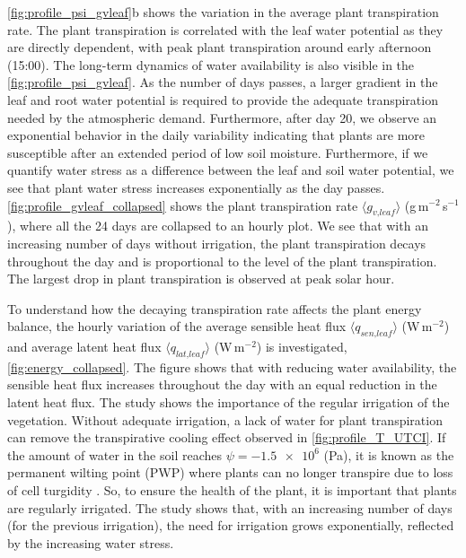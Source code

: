 \cref{fig:profile_psi_gvleaf}b shows the variation in the average plant transpiration rate. The plant transpiration is correlated with the leaf water potential as they are directly dependent, with peak plant transpiration around early afternoon (15:00).  The long-term dynamics of water availability is also visible in the \cref{fig:profile_psi_gvleaf}. As the number of days passes, a larger gradient in the leaf and root water potential is required to provide the adequate transpiration needed by the atmospheric demand. Furthermore, after day 20, we observe an exponential behavior in the daily variability indicating that plants are more susceptible after an extended period of low soil moisture. Furthermore, if we quantify water stress as a difference between the leaf and soil water potential, we see that plant water stress increases exponentially as the day passes. \cref{fig:profile_gvleaf_collapsed} shows the plant transpiration rate $\langle g_{\textit{v,leaf}} \rangle$ (g\,m$^{-2}$\,s$^{-1}$), where all the 24 days are collapsed to an hourly plot. We see that with an increasing number of days without irrigation, the plant transpiration decays throughout the day and is proportional to the level of the plant transpiration. The largest drop in plant transpiration is observed at peak solar hour.

To understand how the decaying transpiration rate affects the plant energy balance, the hourly variation of the average sensible heat flux $\langle q_{\textit{sen,leaf}} \rangle$ (W\,m$^{-2}$) and  average latent heat flux $\langle q_{\textit{lat,leaf}} \rangle$ (W\,m$^{-2}$) is investigated, \cref{fig:energy_collapsed}. The figure shows that with reducing water availability, the sensible heat flux increases throughout the day with an equal reduction in the latent heat flux.   The study shows the importance of the regular irrigation of the vegetation. Without adequate irrigation, a lack of water for plant transpiration can remove the transpirative cooling effect observed in \cref{fig:profile_T_UTCI}. If the amount of water in the soil reaches $\psi = \num{-1.5e6}$ (Pa), it is known as the permanent wilting point (PWP) where plants can no longer transpire due to loss of cell turgidity \citep{Idso1977}. So, to ensure the health of the plant, it is important that plants are regularly irrigated. The study shows that, with an increasing number of days (for the previous irrigation), the need for irrigation grows exponentially, reflected by the increasing water stress.



